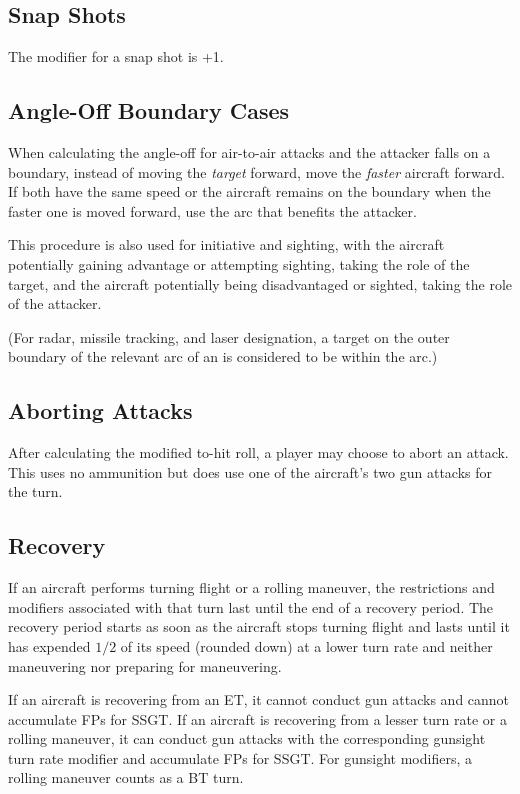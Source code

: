 \documentclass[10pt]{extarticle}
\begin{document}
\subsection{Snap Shots} The modifier for a snap shot is +1.

\subsection{Angle-Off Boundary Cases} When calculating the angle-off for air-to-air attacks and the attacker falls on a boundary, instead of moving the \emph{target} forward, move the \emph{faster} aircraft forward. If both have the same speed or the aircraft remains on the boundary when the faster one is moved forward, use the arc that benefits the attacker. 

This procedure is also used for initiative and sighting, with the aircraft potentially gaining advantage or attempting sighting, taking the role of the target, and the aircraft potentially being disadvantaged or sighted, taking the role of the attacker.

(For radar, missile tracking, and laser designation, a target on the outer boundary of the relevant arc of an is considered to be within the arc.)

\subsection{Aborting Attacks} After calculating the modified to-hit roll, a player may choose to abort an attack. This uses no ammunition but does use one of the aircraft's two gun attacks for the turn.

\subsection{Recovery} If an aircraft performs turning flight or a rolling maneuver, the restrictions and modifiers associated with that turn last until the end of a recovery period. The recovery period starts as soon as the aircraft stops turning flight and lasts until it has expended $1/2$ of its speed (rounded down) at a lower turn rate and neither maneuvering nor preparing for maneuvering. 

If an aircraft is recovering from an ET, it cannot conduct gun attacks and cannot accumulate FPs for SSGT. If an aircraft is recovering from a lesser turn rate or a rolling maneuver, it can conduct gun attacks with the corresponding gunsight turn rate modifier and accumulate FPs for SSGT. For gunsight modifiers, a rolling maneuver counts as a BT turn.
\end{document}
